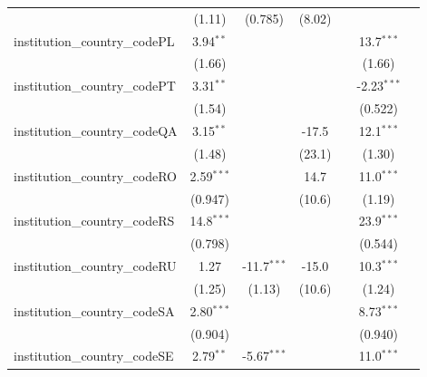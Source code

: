 \begin{tabular}{lcccccc}
                                         & (1.11)         & (0.785)       & (8.02)        &            &               &   \\   
   institution\_country\_codePL          & 3.94$^{**}$    &               &               &            & 13.7$^{***}$  &   \\   
                                         & (1.66)         &               &               &            & (1.66)        &   \\   
   institution\_country\_codePT          & 3.31$^{**}$    &               &               &            & -2.23$^{***}$ &   \\   
                                         & (1.54)         &               &               &            & (0.522)       &   \\   
   institution\_country\_codeQA          & 3.15$^{**}$    &               & -17.5         &            & 12.1$^{***}$  &   \\   
                                         & (1.48)         &               & (23.1)        &            & (1.30)        &   \\   
   institution\_country\_codeRO          & 2.59$^{***}$   &               & 14.7          &            & 11.0$^{***}$  &   \\   
                                         & (0.947)        &               & (10.6)        &            & (1.19)        &   \\   
   institution\_country\_codeRS          & 14.8$^{***}$   &               &               &            & 23.9$^{***}$  &   \\   
                                         & (0.798)        &               &               &            & (0.544)       &   \\   
   institution\_country\_codeRU          & 1.27           & -11.7$^{***}$ & -15.0         &            & 10.3$^{***}$  &   \\   
                                         & (1.25)         & (1.13)        & (10.6)        &            & (1.24)        &   \\   
   institution\_country\_codeSA          & 2.80$^{***}$   &               &               &            & 8.73$^{***}$  &   \\   
                                         & (0.904)        &               &               &            & (0.940)       &   \\   
   institution\_country\_codeSE          & 2.79$^{**}$    & -5.67$^{***}$ &               &            & 11.0$^{***}$  &   \\   

\end{tabular}
